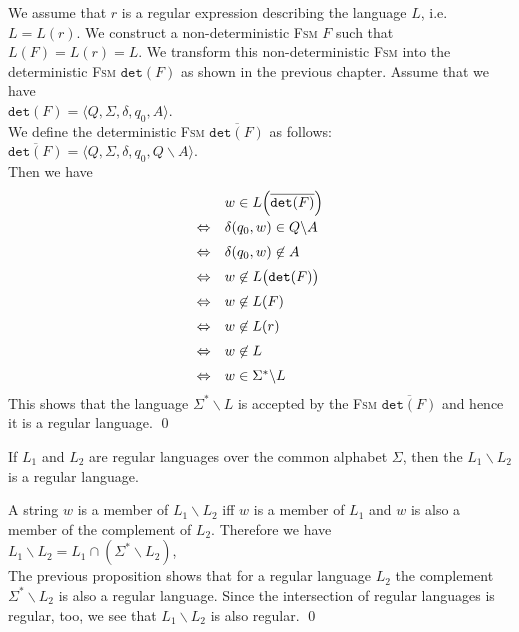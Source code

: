 \proofEng
We assume that $r$ is a regular expression describing the language $L$, i.e.~$L=L(r)$. 
We construct a non-deterministic \textsc{Fsm} $F$ such that $L(F) = L(r) = L$.  
We transform this non-deterministic \textsc{Fsm} into the deterministic \textsc{Fsm} $\mathtt{det}(F)$ as shown
in the previous chapter.
Assume that we have
\\[0.2cm]
\hspace*{1.3cm} $\mathtt{det}(F) = \langle Q, \Sigma, \delta, q_0, A \rangle$.
\\[0.2cm]
We define the deterministic \textsc{Fsm} $\overline{\mathtt{det}(F)}$ as follows:
\\[0.2cm]
\hspace*{1.3cm} $\overline{\mathtt{det}(F)} = \langle Q, \Sigma, \delta, q_0, Q \backslash A \rangle$.
\\[0.2cm]
Then we have
$$
\begin{array}[t]{cl}
                  & w \in L\Bigl(\overline{\mathtt{det}(F)}\Bigr)                      \\[0.2cm]
  \Leftrightarrow & \delta(q_0, w) \in Q \backslash A     \\[0.2cm]
  \Leftrightarrow & \delta(q_0, w) \not\in A \\[0.2cm]
  \Leftrightarrow & w \not\in L\bigl(\mathtt{det}(F)\bigr) \\[0.2cm]
  \Leftrightarrow & w \not\in L(F) \\[0.2cm]
  \Leftrightarrow & w \not\in L(r) \\[0.2cm]
  \Leftrightarrow & w \not\in L \\[0.2cm]
  \Leftrightarrow & w \in \Sigma^* \backslash L 
 \end{array}
$$
This shows that the language $\Sigma^* \backslash L$ is accepted by the \textsc{Fsm} $\overline{\mathtt{det}(F)}$
and hence it is a regular language.
 \qed

\begin{Corollary} \label{kor:mengendif}
  If $L_1$ and $L_2$ are regular languages over the common alphabet $\Sigma$, then the 
   $L_1 \backslash L_2$  is a regular language.
\end{Corollary}

\proofEng
A string $w$ is a member of $L_1 \backslash L_2$ iff $w$ is a member of $L_1$
and $w$ is also a member of the complement of $L_2$.  Therefore we have
\\[0.2cm]
\hspace*{1.3cm}
$L_1 \backslash L_2 = L_1 \cap (\Sigma^* \backslash L_2)$,
\\[0.2cm]
The previous proposition shows that for a regular language $L_2$ the complement
$\Sigma^* \backslash L_2$ is also a regular language.  Since the intersection of regular languages is regular,
too, we see that $L_1 \backslash L_2$ is also regular.
\qed
\vspace*{0.3cm}

